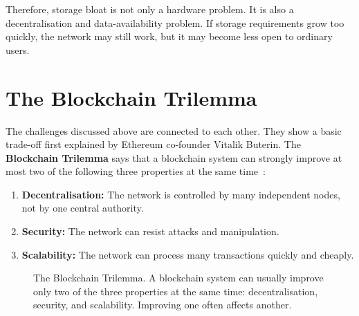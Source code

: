 Therefore, storage bloat is not only a hardware problem. It is also a decentralisation and data-availability problem. If storage requirements grow too quickly, the network may still work, but it may become less open to ordinary users.

\section{The Blockchain Trilemma}
\label{sec:trilemma}

The challenges discussed above are connected to each other. They show a basic trade-off first explained by Ethereum co-founder Vitalik Buterin. The \textbf{Blockchain Trilemma} says that a blockchain system can strongly improve at most two of the following three properties at the same time~\cite{dai2019trilemma}:

\begin{enumerate}
    \item \textbf{Decentralisation:} The network is controlled by many independent nodes, not by one central authority.
    \item \textbf{Security:} The network can resist attacks and manipulation.
    \item \textbf{Scalability:} The network can process many transactions quickly and cheaply.
\end{enumerate}

\begin{figure}[htbp]
\centering
{}
\caption{The Blockchain Trilemma. A blockchain system can usually improve only two of the three properties at the same time: decentralisation, security, and scalability. Improving one often affects another.}
\label{fig:trilemma}
\end{figure}

